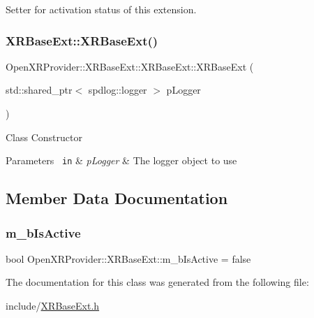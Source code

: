 Setter for activation status of this extension. 

\mbox{\label{class_open_x_r_provider_1_1_x_r_base_ext_a8f59e68df5f1773152a3dfbe9ddc17fc}} 
\subsubsection{\texorpdfstring{XRBaseExt::XRBaseExt()}{XRBaseExt::XRBaseExt()}}
{\footnotesize\ttfamily Open\+X\+R\+Provider\+::\+X\+R\+Base\+Ext\+::\+X\+R\+Base\+Ext\+::\+X\+R\+Base\+Ext (\begin{DoxyParamCaption}\item[{std\+::shared\+\_\+ptr$<$ spdlog\+::logger $>$}]{p\+Logger }\end{DoxyParamCaption})\hspace{0.3cm}{\ttfamily [inline]}}

Class Constructor 
\begin{DoxyParams}[1]{Parameters}
\mbox{\texttt{ in}}  & {\em p\+Logger} & The logger object to use \\
\hline
\end{DoxyParams}


\subsection{Member Data Documentation}
\mbox{\label{class_open_x_r_provider_1_1_x_r_base_ext_ac728d9cf808c7a2c6bb4913568d715c8}} 
\subsubsection{\texorpdfstring{m\_bIsActive}{m\_bIsActive}}
{\footnotesize\ttfamily bool Open\+X\+R\+Provider\+::\+X\+R\+Base\+Ext\+::m\+\_\+b\+Is\+Active = false\hspace{0.3cm}{\ttfamily [private]}}



The documentation for this class was generated from the following file\+:\begin{DoxyCompactItemize}
\item 
include/\mbox{\hyperlink{_x_r_base_ext_8h}{X\+R\+Base\+Ext.\+h}}\end{DoxyCompactItemize}
